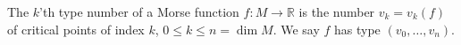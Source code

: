 The $k$'th type number of a Morse function $f: M \rightarrow \mathbb{R}$ is the number $v_k = v_k(f)$ of critical points of index $k$, $0 \leq k \leq n = \dim M$. We say $f$ has type $(v_0, \ldots, v_n)$.
